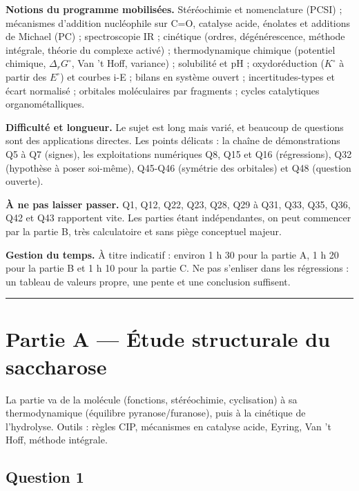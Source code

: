 \documentclass[11pt,a4paper]{article}
\begin{document}
\textbf{Notions du programme mobilisées.} Stéréochimie et nomenclature (PCSI) ; mécanismes d'addition nucléophile sur C=O, catalyse acide, énolates et additions de Michael (PC) ; spectroscopie IR ; cinétique (ordres, dégénérescence, méthode intégrale, théorie du complexe activé) ; thermodynamique chimique (potentiel chimique, \(\Delta_rG^\circ\), Van 't Hoff, variance) ; solubilité et pH ; oxydoréduction (\(K^\circ\) à partir des \(E^\circ\)) et courbes i-E ; bilans en système ouvert ; incertitudes-types et écart normalisé ; orbitales moléculaires par fragments ; cycles catalytiques organométalliques.

\textbf{Difficulté et longueur.} Le sujet est long mais varié, et beaucoup de questions sont des applications directes. Les points délicats : la chaîne de démonstrations Q5 à Q7 (signes), les exploitations numériques Q8, Q15 et Q16 (régressions), Q32 (hypothèse à poser soi-même), Q45-Q46 (symétrie des orbitales) et Q48 (question ouverte).

\textbf{À ne pas laisser passer.} Q1, Q12, Q22, Q23, Q28, Q29 à Q31, Q33, Q35, Q36, Q42 et Q43 rapportent vite. Les parties étant indépendantes, on peut commencer par la partie B, très calculatoire et sans piège conceptuel majeur.

\textbf{Gestion du temps.} À titre indicatif : environ 1 h 30 pour la partie A, 1 h 20 pour la partie B et 1 h 10 pour la partie C. Ne pas s'enliser dans les régressions : un tableau de valeurs propre, une pente et une conclusion suffisent.

\begin{center}\rule{0.5\linewidth}{0.5pt}\end{center}

\hypertarget{partie-a-uxe9tude-structurale-du-saccharose}{%
\section{Partie A --- Étude structurale du saccharose}\label{partie-a-uxe9tude-structurale-du-saccharose}}

La partie va de la molécule (fonctions, stéréochimie, cyclisation) à sa thermodynamique (équilibre pyranose/furanose), puis à la cinétique de l'hydrolyse. Outils : règles CIP, mécanismes en catalyse acide, Eyring, Van 't Hoff, méthode intégrale.

\hypertarget{question-1}{%
\subsection{Question 1}\label{question-1}}
\end{document}
